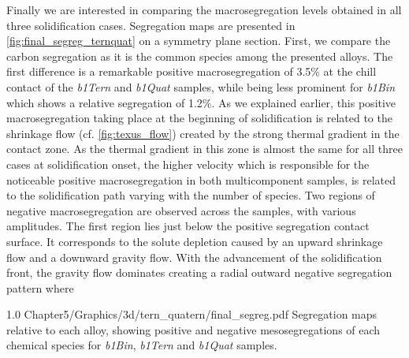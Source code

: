 Finally we are interested in comparing the macrosegregation levels obtained in all three solidification cases. Segregation maps
are presented in \cref{fig:final_segreg_ternquat} on a symmetry plane section. First, we compare the carbon segregation as it is the common species among the presented alloys.
The first difference is a remarkable positive macrosegregation of 3.5\% at the chill contact of the  \emph{b1Tern} and \emph{b1Quat} samples, 
while being less prominent for \emph{b1Bin} which shows a relative segregation of 1.2\%. As we explained earlier, this positive macrosegregation taking place at the beginning
of solidification is related to the shrinkage flow (cf. \cref{fig:texus_flow}) created by the strong thermal gradient in the contact zone. 
As the thermal gradient in this zone is almost the same
for all three cases at solidification onset, the higher velocity which is responsible for the noticeable positive macrosegregation in both multicomponent samples,
is related to the solidification path varying with the number of species.
Two regions of negative macrosegregation are observed across the samples, with various amplitudes. The first region lies just below the positive segregation contact surface.
It corresponds to the solute depletion caused by an upward shrinkage flow and a downward gravity flow. With the advancement of the solidification front,
the gravity flow dominates creating a radial outward negative segregation pattern where  


\begin{figureth}
{1.0}
{Chapter5/Graphics/3d/tern_quatern/final_segreg.pdf}
{Segregation maps relative to each alloy, showing positive and negative mesosegregations 
of each chemical species for \emph{b1Bin}, \emph{b1Tern} and \emph{b1Quat} samples.}
\label{fig:final_segreg_ternquat}
\end{figureth}



